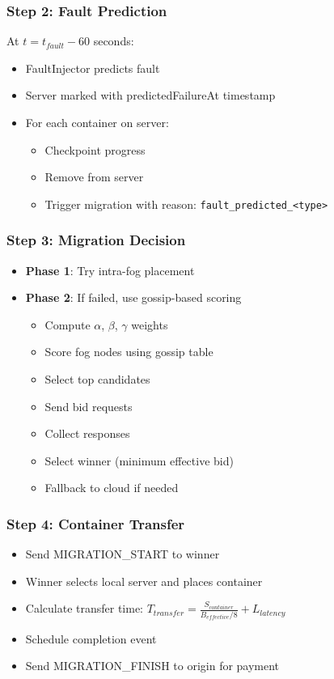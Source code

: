 \documentclass[12pt,a4paper]{article}
\begin{document}
\subsubsection{Step 2: Fault Prediction}
At $t = t_{fault} - 60$ seconds:
\begin{itemize}
    \item FaultInjector predicts fault
    \item Server marked with predictedFailureAt timestamp
    \item For each container on server:
    \begin{itemize}
        \item Checkpoint progress
        \item Remove from server
        \item Trigger migration with reason: \texttt{fault\_predicted\_<type>}
    \end{itemize}
\end{itemize}

\subsubsection{Step 3: Migration Decision}
\begin{itemize}
    \item \textbf{Phase 1}: Try intra-fog placement
    \item \textbf{Phase 2}: If failed, use gossip-based scoring
    \begin{itemize}
        \item Compute $\alpha$, $\beta$, $\gamma$ weights
        \item Score fog nodes using gossip table
        \item Select top candidates
        \item Send bid requests
        \item Collect responses
        \item Select winner (minimum effective bid)
        \item Fallback to cloud if needed
    \end{itemize}
\end{itemize}

\subsubsection{Step 4: Container Transfer}
\begin{itemize}
    \item Send MIGRATION\_START to winner
    \item Winner selects local server and places container
    \item Calculate transfer time: $T_{transfer} = \frac{S_{container}}{B_{effective}/8} + L_{latency}$
    \item Schedule completion event
    \item Send MIGRATION\_FINISH to origin for payment
\end{itemize}
\end{document}
